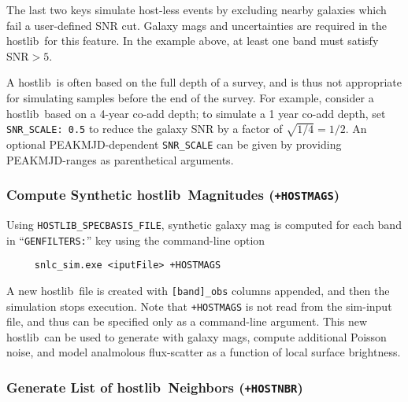 \documentclass[12pt]{article}
\newcommand{\hostlib}{{\sc hostlib}}
\begin{document}
{The last two keys simulate host-less events by excluding nearby galaxies
which fail a user-defined SNR cut.
Galaxy mags and uncertainties are required in the
\hostlib\ for this feature. 
In the example above, at least one band must satisfy SNR$>5$.

A \hostlib\ is often based on the full depth of a survey,
and is thus not appropriate for simulating samples before
the end of the survey.
For example, consider a \hostlib\ based on a 4-year co-add depth;
to simulate a 1 year co-add depth, set {\tt SNR\_SCALE: 0.5}
to reduce the galaxy SNR by a factor of $\sqrt{1/4}=1/2$.
An optional PEAKMJD-dependent {\tt SNR\_SCALE} can be given
by providing PEAKMJD-ranges as parenthetical arguments.

\clearpage
\subsubsection{Compute Synthetic \hostlib\ Magnitudes ({\tt +HOSTMAGS})}
\label{sss:hostlib_synmag}

Using {\tt HOSTLIB\_SPECBASIS\_FILE}, synthetic galaxy mag is 
computed for each band in ``{\tt GENFILTERS:}'' key
using the command-line option
\begin{verbatim}
     snlc_sim.exe <iputFile> +HOSTMAGS
\end{verbatim}
A new \hostlib\ file is created with {\tt [band]\_obs} columns appended,
and then the simulation stops execution.
Note that {\tt +HOSTMAGS} is not read from the sim-input file, 
and thus can be specified only as a command-line argument.
This new \hostlib\ can be used to generate with galaxy mags,
compute additional Poisson noise, and model analmolous 
flux-scatter as a function of local surface brightness.

\subsubsection{Generate List of \hostlib\ Neighbors ({\tt +HOSTNBR})}
\label{sss:hostlib_NBR}

}
\end{document}
